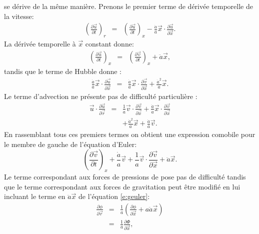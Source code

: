    se dérive de la même manière. Prenons le premier terme de dérivée temporelle de la vitesse:
 \begin{eqnarray}
 \left(\frac{\partial \vec u}{\partial t}\right)_r&=&\left(\frac{\partial \vec u}{\partial t}\right)_x-\frac{\dot a }{a}\vec x \cdot \frac{\partial \vec u}{\partial \vec x}.
\end{eqnarray}  
La dérivée temporelle à $\vec x$ constant donne:
\begin{eqnarray}
\left(\frac{\partial \vec u}{\partial t}\right)_x&=&\left(\frac{\partial \vec v}{\partial t}\right)_x + \ddot a {\vec x},
\end{eqnarray}
tandis que le terme de Hubble donne :
\begin{eqnarray}
\frac{\dot a }{a}\vec x \cdot \frac{\partial \vec u}{\partial \vec x}&=&\frac{\dot a }{a}\vec x \cdot \frac{\partial \vec v}{\partial \vec x}+\frac{\dot a^2}{a}\vec x.
\end{eqnarray}
 Le terme d'advection ne présente pas de difficulté particulière  :
 \begin{eqnarray}
 \vec u \cdot \frac{\partial \vec u}{\partial \vec r}&=&\frac{1}{a}\vec v \cdot \frac{\partial \vec v}{\partial \vec x}+\frac{\dot a}{a}\vec x \cdot \frac{\partial \vec v}{\partial \vec x}\\
 &&+ \frac{\dot a^2}{a}\vec x +\frac{\dot a}{a}\vec v.
 \end{eqnarray}
 En rassemblant tous ces premiers termes on obtient une expression comobile pour le membre de gauche de l'équation d'Euler:
 \begin{equation}
 \left(\frac{\partial \vec v}{\partial t}\right)_x +\frac{\dot a}{a}\vec v+\frac{1}{a}\vec v \cdot \frac{\partial \vec v}{\partial \vec x} + \ddot a {\vec x}. 
 \label{e:geuler}
 \end{equation}
 Le terme correspondant aux forces de pressions de pose pas de difficulté tandis que le terme correspondant aux forces de gravitation peut être modifié en lui incluant le terme en $\ddot a {\vec x}$ de l'équation \ref{e:geuler}:
 \begin{eqnarray}
  \frac{\partial \phi}{\partial \vec r}&=&\frac{1}{a}(\frac{\partial \phi}{\partial \vec x}+a\ddot a \vec x)\\
  &=&\frac{1}{a}\frac{\partial \Phi}{\partial \vec x},
 \end{eqnarray}
